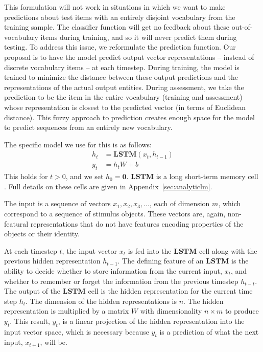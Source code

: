 \documentclass{article}
\newcommand{\appref}[1]{Appendix~\ref{#1}}
\newcommand{\LSTM}{\textbf{LSTM}}
\renewcommand{\cite}{\citep}
\begin{document}
This formulation will not work in situations in which we want to make predictions about test items with an entirely disjoint vocabulary from the training sample. The classifier function will get no feedback about these out-of-vocabulary items during training, and so it will never predict them during testing. To address this issue, we reformulate the prediction function. Our proposal is to have the model predict output vector representations -- instead of discrete vocabulary items -- at each timestep. During training, the model is trained to minimize the distance between these output predictions and the representations of the actual output entities. During assessment, we take the prediction to be the item in the entire vocabulary (training and assessment) whose representation is closest to the predicted vector (in terms of Euclidean distance). This fuzzy approach to prediction creates enough space for the model to predict sequences from an entirely new vocabulary.

The specific model we use for this is as follows:
%
\begin{align}
h_{t} &= \LSTM(x_{t}, h_{t-1}) \label{eq:lstm-recur}\\
y_{t} &= h_{t}W + b\label{eq:lstm-predict}
\end{align}
%
This holds for $t > 0$, and we set $h_{0} = \mathbf{0}$. $\LSTM$ is a long short-term memory cell \cite{hochreiter:1997}. Full details on these cells are given in \appref{sec:analyticlm}.

The input is a sequence of vectors $x_1, x_2, x_3, \dots$, each of dimension $m$, which correspond to a sequence of stimulus objects. These vectors are, again, non-featural representations that do not have features encoding properties of the objects or their identity.


At each timestep $t$, the input vector $x_t$ is fed into the $\LSTM$ cell along with the previous hidden representation $h_{t-1}$. The defining feature of an $\LSTM$ is the ability to decide whether to store information from the current input, $x_t$, and whether to remember or forget the information from the previous timestep $h_{t-t}$. The output of the $\LSTM$ cell is the hidden representation for the current time step $h_t$. The dimension of the hidden representations is $n$. The hidden representation is multiplied by a matrix $W$ with dimensionality $n \times m$ to produce $y_t$. This result, $y_t$, is a linear projection of the hidden representation into the input vector space, which is necessary because $y_t$ is a prediction of what the next input, $x_{t+1}$, will be.
\end{document}
